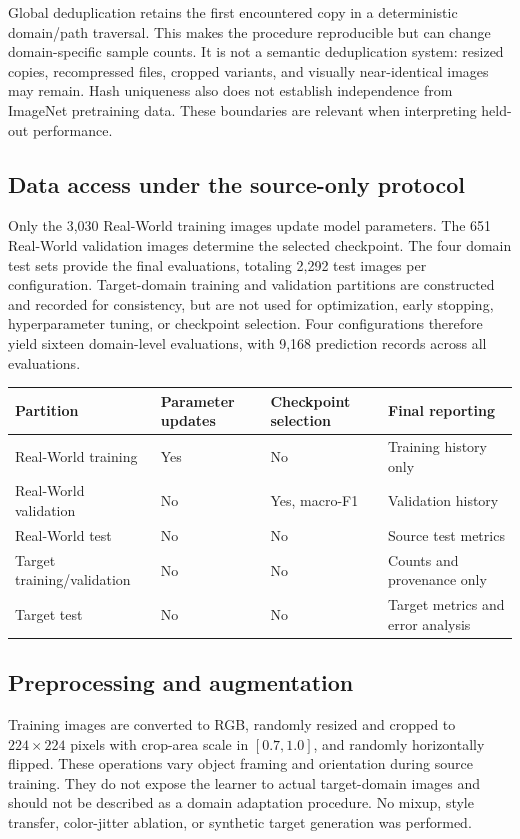 \documentclass[10pt,a4paper]{article}
\begin{document}
Global deduplication retains the first encountered copy in a deterministic domain/path traversal. This makes the procedure reproducible but can change domain-specific sample counts. It is not a semantic deduplication system: resized copies, recompressed files, cropped variants, and visually near-identical images may remain. Hash uniqueness also does not establish independence from ImageNet pretraining data. These boundaries are relevant when interpreting held-out performance.

\subsection{Data access under the source-only protocol}
Only the 3,030 Real-World training images update model parameters. The 651 Real-World validation images determine the selected checkpoint. The four domain test sets provide the final evaluations, totaling 2,292 test images per configuration. Target-domain training and validation partitions are constructed and recorded for consistency, but are not used for optimization, early stopping, hyperparameter tuning, or checkpoint selection. Four configurations therefore yield sixteen domain-level evaluations, with 9,168 prediction records across all evaluations.

\begin{center}\begin{minipage}{\linewidth}\centering
{}
\begin{tabularx}{\linewidth}{p{4cm}XXX}
\toprule
Partition & Parameter updates & Checkpoint selection & Final reporting\\
\midrule
Real-World training & Yes & No & Training history only\\
Real-World validation & No & Yes, macro-F1 & Validation history\\
Real-World test & No & No & Source test metrics\\
Target training/validation & No & No & Counts and provenance only\\
Target test & No & No & Target metrics and error analysis\\
\bottomrule
\end{tabularx}
\end{minipage}\end{center}

\subsection{Preprocessing and augmentation}
Training images are converted to RGB, randomly resized and cropped to $224\times224$ pixels with crop-area scale in $[0.7,1.0]$, and randomly horizontally flipped. These operations vary object framing and orientation during source training. They do not expose the learner to actual target-domain images and should not be described as a domain adaptation procedure. No mixup, style transfer, color-jitter ablation, or synthetic target generation was performed.
\end{document}
